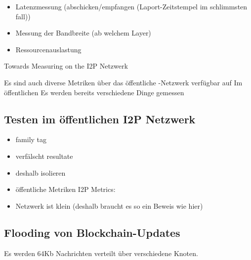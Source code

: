 \begin{itemize}
    \item Latenzmessung (abschicken/empfangen (Laport-Zeitstempel im schlimmsten fall))
    \item Messung der Bandbreite (ab welchem Layer)
    \item Ressourcenauslastung
\end{itemize}

Towards Measuring on the I2P Netzwerk
\cite{wang_towards_2013}


Es sind auch diverse Metriken über das öffentliche -Netzwerk verfügbar auf
Im öffentlichen  Es werden bereits verschiedene Dinge gemessen


\cite{timpanaro_monitoring_nodate}

\subsection{Testen im öffentlichen I2P Netzwerk}

\begin{itemize}
    \item family tag \cite{noauthor_family_nodate}
    \item verfälscht resultate
    \item deshalb isolieren
    \item öffentliche Metriken  I2P Metrics: \cite{noauthor_i2p_nodate-4}
    \item Netzwerk ist klein (deshalb braucht es so ein Beweis wie hier)
\end{itemize}

\subsection{Flooding von Blockchain-Updates}

Es werden 64Kb Nachrichten verteilt über verschiedene Knoten.

